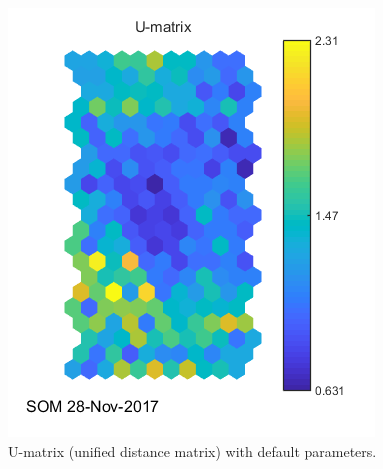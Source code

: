 \documentclass[a4paper,11pt,twocolumn]{article}
\begin{document}
\begin{figure}[!h]
  \centering
  \includegraphics[width=\linewidth]{figures/U-matrix.png}
  \caption{U-matrix (unified distance matrix) with default parameters.}
  \label{fig:u}
\end{figure}
\end{document}
